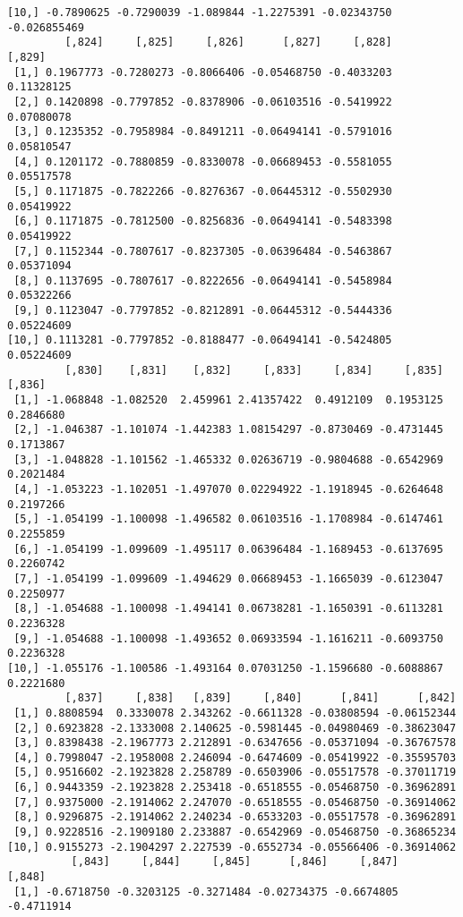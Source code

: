 \documentclass[
  letterpaper,
  DIV=11,
  numbers=noendperiod]{scrreprt}
\begin{document}
\begin{verbatim}
[10,] -0.7890625 -0.7290039 -1.089844 -1.2275391 -0.02343750 -0.026855469
         [,824]     [,825]     [,826]      [,827]     [,828]     [,829]
 [1,] 0.1967773 -0.7280273 -0.8066406 -0.05468750 -0.4033203 0.11328125
 [2,] 0.1420898 -0.7797852 -0.8378906 -0.06103516 -0.5419922 0.07080078
 [3,] 0.1235352 -0.7958984 -0.8491211 -0.06494141 -0.5791016 0.05810547
 [4,] 0.1201172 -0.7880859 -0.8330078 -0.06689453 -0.5581055 0.05517578
 [5,] 0.1171875 -0.7822266 -0.8276367 -0.06445312 -0.5502930 0.05419922
 [6,] 0.1171875 -0.7812500 -0.8256836 -0.06494141 -0.5483398 0.05419922
 [7,] 0.1152344 -0.7807617 -0.8237305 -0.06396484 -0.5463867 0.05371094
 [8,] 0.1137695 -0.7807617 -0.8222656 -0.06494141 -0.5458984 0.05322266
 [9,] 0.1123047 -0.7797852 -0.8212891 -0.06445312 -0.5444336 0.05224609
[10,] 0.1113281 -0.7797852 -0.8188477 -0.06494141 -0.5424805 0.05224609
         [,830]    [,831]    [,832]     [,833]     [,834]     [,835]    [,836]
 [1,] -1.068848 -1.082520  2.459961 2.41357422  0.4912109  0.1953125 0.2846680
 [2,] -1.046387 -1.101074 -1.442383 1.08154297 -0.8730469 -0.4731445 0.1713867
 [3,] -1.048828 -1.101562 -1.465332 0.02636719 -0.9804688 -0.6542969 0.2021484
 [4,] -1.053223 -1.102051 -1.497070 0.02294922 -1.1918945 -0.6264648 0.2197266
 [5,] -1.054199 -1.100098 -1.496582 0.06103516 -1.1708984 -0.6147461 0.2255859
 [6,] -1.054199 -1.099609 -1.495117 0.06396484 -1.1689453 -0.6137695 0.2260742
 [7,] -1.054199 -1.099609 -1.494629 0.06689453 -1.1665039 -0.6123047 0.2250977
 [8,] -1.054688 -1.100098 -1.494141 0.06738281 -1.1650391 -0.6113281 0.2236328
 [9,] -1.054688 -1.100098 -1.493652 0.06933594 -1.1616211 -0.6093750 0.2236328
[10,] -1.055176 -1.100586 -1.493164 0.07031250 -1.1596680 -0.6088867 0.2221680
         [,837]     [,838]   [,839]     [,840]      [,841]      [,842]
 [1,] 0.8808594  0.3330078 2.343262 -0.6611328 -0.03808594 -0.06152344
 [2,] 0.6923828 -2.1333008 2.140625 -0.5981445 -0.04980469 -0.38623047
 [3,] 0.8398438 -2.1967773 2.212891 -0.6347656 -0.05371094 -0.36767578
 [4,] 0.7998047 -2.1958008 2.246094 -0.6474609 -0.05419922 -0.35595703
 [5,] 0.9516602 -2.1923828 2.258789 -0.6503906 -0.05517578 -0.37011719
 [6,] 0.9443359 -2.1923828 2.253418 -0.6518555 -0.05468750 -0.36962891
 [7,] 0.9375000 -2.1914062 2.247070 -0.6518555 -0.05468750 -0.36914062
 [8,] 0.9296875 -2.1914062 2.240234 -0.6533203 -0.05517578 -0.36962891
 [9,] 0.9228516 -2.1909180 2.233887 -0.6542969 -0.05468750 -0.36865234
[10,] 0.9155273 -2.1904297 2.227539 -0.6552734 -0.05566406 -0.36914062
          [,843]     [,844]     [,845]      [,846]     [,847]     [,848]
 [1,] -0.6718750 -0.3203125 -0.3271484 -0.02734375 -0.6674805 -0.4711914

\end{verbatim}
\end{document}
